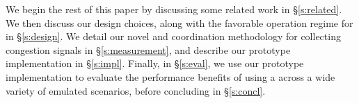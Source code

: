 
We begin the rest of this paper by discussing some related work in \S\ref{s:related}. We then discuss our design choices, along with the favorable operation regime for \name in \S\ref{s:design}. We detail our novel \inbox and \outbox coordination methodology for collecting congestion signals in \S\ref{s:measurement}, and describe our prototype implementation in \S\ref{s:impl}. 
Finally, in \S\ref{s:eval}, we use our prototype implementation to evaluate the performance benefits of using a \name across a wide variety of emulated scenarios, before concluding in \S\ref{s:concl}.



